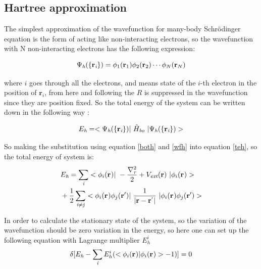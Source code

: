 \documentclass[a4paper, 12pt, titlepage,oneside,drop]{kthesis}
\begin{document}

\subsection{Hartree approximation}
\label{ha}
\noindent The simplest approximation of the wavefunction for many-body Schrödinger equation is the form of acting like non-interacting 
electrons, so the wavefunction with N non-interacting electrons has the following expression:

\begin{equation}\label{wfh}
\wfh = \bwf<1><1> \bwf<2><2> \cdots \bwf<N><N> 
\end{equation}

\noindent where $i$ goes through all the electrons, and  means state of the $i$-th electron in the position of ${\textbf{r}}_{\textit{i}}$, 
from here and following the $R$ is suppressed in the wavefunction since they are position fixed. So the total energy of the system can be written down 
in the following way :

\begin{equation}\label{teh}
E_{\textit{h}} = <\Psi_{{\textit h}}(\{ {\textbf r}_{{\textit i}}\}) |\ {\hat{H}}_{\textit{bo}} \ | \Psi_{{\textit h}}(\{ {\textbf r}_{{\textit i}}\})  >
\end{equation}

\noindent So making the substitution using equation \ref{both} and \ref{wfh} into equation \ref{teh}, so the total energy of system is:
\begin{equation}\begin{split}
&E_\textit{h} = \sumi<i> <\bwf<i><> |\ -\frac{\nabla^{2}_{\textit r}}{2} + V_\textit{ext}(\textbf{r})  \ | \bwf<i><> > \\
& +\frac{1}{2} \suminj<i><j> <\bwf<i><> \bwfn<j><'>|\ \frac{1}{|\textbf{r} - \textbf{r}^{'} |} \ | \bwf<i><> \bwfn<j><'>>
\end{split}\end{equation}

\noindent In order to calculate the stationary state of the system, so the variation of the wavefunction should be
zero variation in the energy, so here one can set up the following equation with Lagrange multiplier $E^{i}_h$
\begin{equation}\label{haa}
 \delta [ E_{\textit{h}} - \sumi<i> E^{i}_{h} (<\bwf<i><> | \bwf<i><> > -1)] = 0 
\end{equation}
\end{document}
